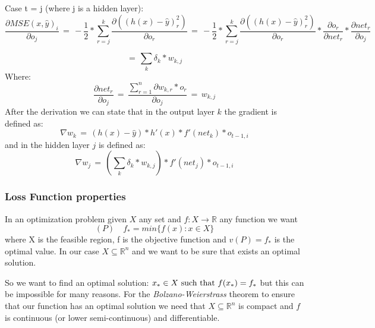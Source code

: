 Case t = j (where j is a hidden layer):
\begin{equation*}
\frac{\partial MSE(x, \hat{y})_i}{\partial o_{j}} \,
 = \, -\frac{1}{2} * \sum_{r=j}^k\frac{ \partial((h(x) - \widehat{y})_{r}^2)}{\partial o_{r}} \, 
= \, -\frac{1}{2} * \sum_{r=j}^k\frac{ \partial((h(x) - \widehat{y})_{r}^2)}{\partial o_{r}} * \frac{\partial o_{r}}{\partial net_{r}} * \frac{\partial net_{r}}{\partial o_{j}}
\end{equation*}

\begin{equation}
\label{retropagation}
= \, \sum_{k} \delta_{k} * w_{k,j}
\end{equation}
Where:
\begin{equation*}
\frac{\partial net_{r}}{\partial o_{j}} \, = \, \frac{\sum_{r=1}^n\partial w_{k,r}*o_{r}}{\partial o_{j}} \, = \,  w_{k,j}
\end{equation*}
After the derivation we can state that in the output layer $k$ the gradient is defined as: 
\begin{equation}
\label{partialOutput}
\nabla w_{k} \, = \, (h(x)-\hat{y}) * h'(x) * f'(net_{k})  * o_{t-1,i}
\end{equation}
and in the hidden layer $j$ is defined as:
\begin{equation}
\label{partialHidden}
\nabla w_{j} \, = \, (\sum_{k} \delta_{k} * w_{k,j}) * f'(net_{j}) * o_{t-1,i}
\end{equation}

\subsubsection{Loss Function properties}
\label{LF:Properties}
In an optimization problem given $X$ any set and $f: X \rightarrow \mathbb{R}$ any function we want
\begin{equation}
(P) \quad f_{*} = min \{f(x) : x \in X\}
\end{equation}
where X is the feasible region, f is the objective function and $v(P) = f_{*}$ is the optimal value. In our case $X \subseteq \mathbb{R}^{n}$ and we want to be sure that exists an optimal solution.

So we want to find an optimal solution: $x_{*} \in X  \textnormal{ such that } f(x_{*}) = f_{*}$ but this can be impossible for many reasons. For the \textit{Bolzano-Weierstrass} theorem to ensure that our function has an optimal solution we need that $X \subseteq \mathbb{R}^{n}$ is compact and $f$ is continuous (or lower semi-continuous) and differentiable. 

